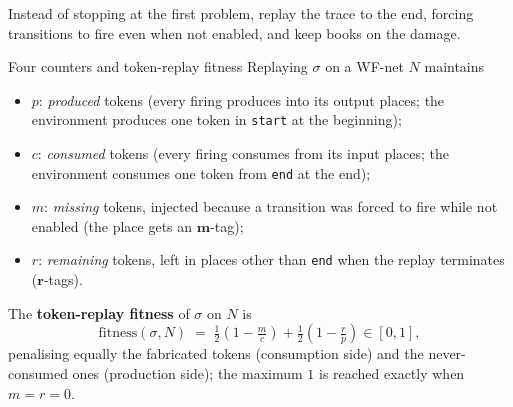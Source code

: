 Instead of stopping at the first problem, replay the trace to the end, forcing transitions to fire even when not enabled, and keep books on the damage.
\begin{definitionbox}{Four counters and token-replay fitness}
Replaying $\sigma$ on a WF-net $N$ maintains
\begin{itemize}
  \item $p$: \emph{produced} tokens (every firing produces into its output places; the environment produces one token in \texttt{start} at the beginning);
  \item $c$: \emph{consumed} tokens (every firing consumes from its input places; the environment consumes one token from \texttt{end} at the end);
  \item $m$: \emph{missing} tokens, injected because a transition was forced to fire while not enabled (the place gets an $\mathbf{m}$-tag);
  \item $r$: \emph{remaining} tokens, left in places other than \texttt{end} when the replay terminates ($\mathbf{r}$-tags).
\end{itemize}
The \textbf{token-replay fitness} of $\sigma$ on $N$ is
$$\text{fitness}(\sigma, N) \;=\; \tfrac{1}{2}\!\left(1 - \tfrac{m}{c}\right) + \tfrac{1}{2}\!\left(1 - \tfrac{r}{p}\right) \in [0,1],$$
penalising equally the fabricated tokens (consumption side) and the never-consumed ones (production side); the maximum $1$ is reached exactly when $m = r = 0$.
\end{definitionbox}

